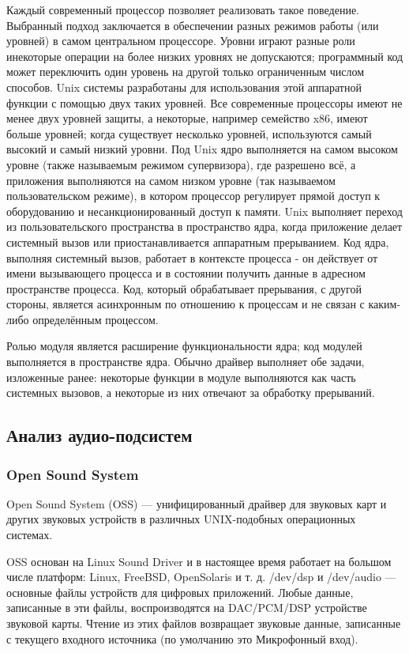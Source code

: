 Каждый современный процессор позволяет реализовать такое поведение. Выбранный подход заключается в обеспечении разных режимов работы (или уровней) в самом центральном процессоре. Уровни играют разные роли инекоторые операции на более низких уровнях не допускаются; программный код может переключить один уровень на другой только ограниченным числом способов. Unix системы разработаны для использования этой аппаратной функции с помощью двух таких уровней. Все современные процессоры имеют не менее двух уровней защиты, а некоторые, например семейство x86, имеют больше уровней; когда существует несколько уровней, используются самый высокий и самый низкий уровни. Под Unix ядро выполняется на самом высоком уровне (также называемым режимом супервизора), где разрешено всё, а приложения выполняются на самом низком уровне (так называемом пользовательском режиме), в котором процессор регулирует прямой доступ к оборудованию и несанкционированный доступ к памяти. Unix выполняет переход из пользовательского пространства в пространство ядра, когда приложение делает системный вызов или приостанавливается аппаратным прерыванием. Код ядра, выполняя системный вызов, работает в контексте процесса - он действует от имени вызывающего процесса и в состоянии получить данные в адресном пространстве процесса. Код, который обрабатывает прерывания, с другой стороны, является асинхронным по отношению к процессам и не связан с каким-либо определённым процессом. 

Ролью модуля является расширение функциональности ядра; код модулей выполняется в пространстве ядра. Обычно драйвер выполняет обе задачи, изложенные ранее: некоторые функции в модуле выполняются как часть системных вызовов, а некоторые из них отвечают за обработку прерываний.

\subsection{Анализ аудио-подсистем}
\subsubsection{Open Sound System}

Open Sound System (OSS) — унифицированный драйвер для звуковых карт и других звуковых устройств в различных UNIX-подобных операционных системах.

OSS основан на Linux Sound Driver и в настоящее время работает на большом числе платформ: Linux, FreeBSD, OpenSolaris и т. д. \cite{3} /dev/dsp и /dev/audio — основные файлы устройств для цифровых приложений. Любые данные, записанные в эти файлы, воспроизводятся на DAC/PCM/DSP устройстве звуковой карты. Чтение из этих файлов возвращает звуковые данные, записанные с текущего входного источника (по умолчанию это Микрофонный вход).


